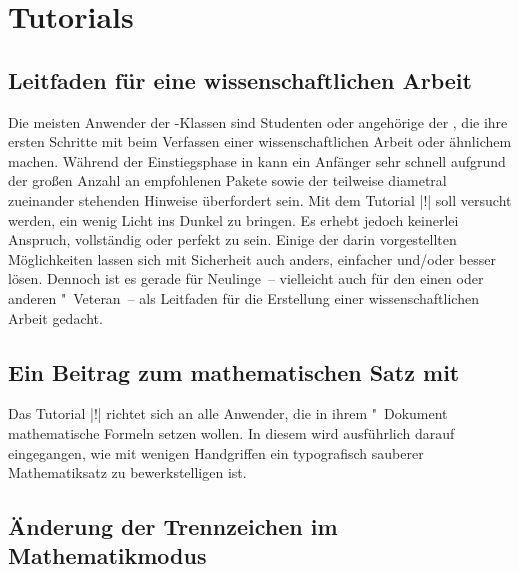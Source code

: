 \chapter{%
  Tutorials%
  \label{sec:tut}%
}
\section{%
  Leitfaden für eine wissenschaftlichen Arbeit%
}

Die meisten Anwender der \TUDScript-Klassen sind Studenten oder angehörige der 
\TnUD, die ihre ersten Schritte mit  beim Verfassen einer 
wissenschaftlichen Arbeit oder ähnlichem machen. Während der Einstiegsphase in 
 kann ein Anfänger sehr schnell aufgrund der großen Anzahl an 
empfohlenen Pakete sowie der teilweise diametral zueinander stehenden Hinweise 
überfordert sein. Mit dem Tutorial |!| soll versucht werden, 
ein wenig Licht ins Dunkel zu bringen. Es erhebt jedoch keinerlei Anspruch, 
vollständig oder perfekt zu sein. Einige der darin vorgestellten Möglichkeiten 
lassen sich mit Sicherheit auch anders, einfacher und/oder besser lösen. 
Dennoch ist es gerade für Neulinge~-- vielleicht auch für den einen oder 
anderen "~Veteran~-- als Leitfaden für die Erstellung einer 
wissenschaftlichen Arbeit gedacht.



\section{%
  Ein Beitrag zum mathematischen Satz mit %
}

Das Tutorial |!| richtet sich an alle Anwender, die in ihrem 
"~Dokument mathematische Formeln setzen wollen. In diesem wird 
ausführlich darauf eingegangen, wie mit wenigen Handgriffen ein typografisch 
sauberer Mathematiksatz zu bewerkstelligen ist.



\section{%
  Änderung der Trennzeichen im Mathematikmodus%
}

